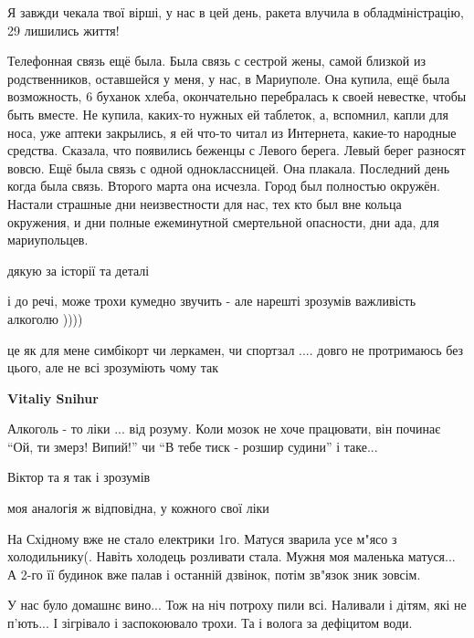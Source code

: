 
 
 
 
 

\qqSecCmt


Я завжди чекала твої вірші, у нас в цей день, ракета влучила в
обладміністрацію, 29 лишились життя!


Телефонная связь ещё была. Была связь с сестрой жены, самой близкой из
родственников, оставшейся у меня, у нас, в Мариуполе. Она купила, ещё была
возможность, 6 буханок хлеба, окончательно перебралась к своей невестке, чтобы
быть вместе. Не купила, каких-то нужных ей таблеток, а, вспомнил, капли для
носа, уже аптеки закрылись, я ей что-то читал из Интернета, какие-то народные
средства. Сказала, что появились беженцы с Левого берега. Левый берег разносят
вовсю. Ещё была связь с одной одноклассницей. Она плакала. Последний день когда
была связь. Второго марта она исчезла. Город был полностью окружён. Настали
страшные дни неизвестности для нас, тех кто был вне кольца окружения, и дни
полные ежеминутной смертельной опасности, дни ада, для мариупольцев.


дякую за історії та деталі


і до речі, може трохи кумедно звучить - але нарешті зрозумів важливість
алкоголю ))))

це як для мене симбікорт чи леркамен, чи спортзал .... довго не протримаюсь без
цього, але не всі зрозуміють чому так 🙂

\begin{itemize} %
\textbf{Vitaliy Snihur} 

Алкоголь - то ліки ... від розуму. Коли мозок не хоче працювати, він починає
\enquote{Ой, ти змерз! Випий!} чи \enquote{В тебе тиск - розшир судини} і таке...


Віктор та я так і зрозумів 🙂

моя аналогія ж відповідна, у кожного свої ліки 🙂

\end{itemize} %


На Східному вже не стало електрики 1го. Матуся зварила усе м"ясо з
холодильнику(. Навіть холодець розливати стала. Мужня моя маленька матуся... А
2-го її будинок вже палав і останній дзвінок, потім зв"язок зник зовсім.


У нас було домашнє вино... Тож на ніч потроху пили всі. Наливали і дітям, які не
п'ють... І зігрівало і заспокоювало трохи. Та і волога за дефіцитом води.
